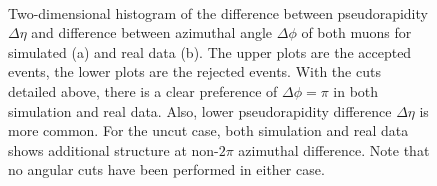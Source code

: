 \documentclass[twoside,        %
               BCOR12mm,       %
               ngerman,english, %
               fleqn,headsepline=false,footsepline=false
              ]{Vorlage/MFPREPORT}
\begin{document}
\begin{figure}
     \begin{center}
         \\ %
    \end{center}
    \caption{Two-dimensional histogram of the difference between pseudorapidity
    $\Delta\eta$ and difference between azimuthal angle $\Delta\phi$ of both muons
    for simulated (a) and real data (b). The upper plots are the accepted
    events, the lower plots are the rejected events. With the cuts detailed
    above, there is a clear preference of $\Delta\phi=\pi$ in both simulation
    and real data. Also, lower pseudorapidity difference $\Delta\eta$ is more
    common. For the uncut case, both simulation and real data shows additional
    structure at non-$2\pi$ azimuthal difference. Note that no angular cuts
    have been performed in either case.}
   \label{fig:angle}
\end{figure}
\end{document}
